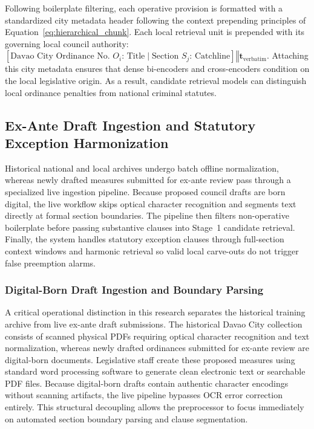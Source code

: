         Following boilerplate filtering, each operative provision is formatted with a standardized city metadata header following the context prepending principles of Equation~\ref{eq:hierarchical_chunk}. Each local retrieval unit is prepended with its governing local council authority: $\left[ \text{Davao City Ordinance No. } O_i\text{: Title} \mid \text{Section } S_j\text{: Catchline} \right] \mathbin{\Vert} \mathbf{t}_{\text{verbatim}}$. Attaching this city metadata ensures that dense bi-encoders and cross-encoders condition on the local legislative origin. As a result, candidate retrieval models can distinguish local ordinance penalties from national criminal statutes.

    \subsection{Ex-Ante Draft Ingestion and Statutory Exception Harmonization}
    \label{sec:draft_ingestion_segmentation}
    \label{sec:exception_handling}
    Historical national and local archives undergo batch offline normalization, whereas newly drafted measures submitted for ex-ante review pass through a specialized live ingestion pipeline. Because proposed council drafts are born digital, the live workflow skips optical character recognition and segments text directly at formal section boundaries. The pipeline then filters non-operative boilerplate before passing substantive clauses into Stage~1 candidate retrieval. Finally, the system handles statutory exception clauses through full-section context windows and harmonic retrieval so valid local carve-outs do not trigger false preemption alarms.

        \subsubsection{Digital-Born Draft Ingestion and Boundary Parsing}
        \label{sec:draft_ingestion_pipeline}
        A critical operational distinction in this research separates the historical training archive from live ex-ante draft submissions. The historical Davao City collection consists of scanned physical PDFs requiring optical character recognition and text normalization, whereas newly drafted ordinances submitted for ex-ante review are digital-born documents. Legislative staff create these proposed measures using standard word processing software to generate clean electronic text or searchable PDF files. Because digital-born drafts contain authentic character encodings without scanning artifacts, the live pipeline bypasses OCR error correction entirely. This structural decoupling allows the preprocessor to focus immediately on automated section boundary parsing and clause segmentation.

